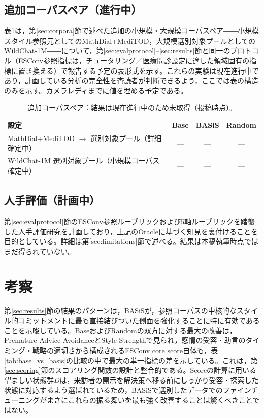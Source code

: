 \documentclass[manuscript,review,anonymous]{acmart}
\begin{document}
\subsection{追加コーパスペア（進行中）}
表\ref{tab:pending}は，第\ref{sec:corpora}節で述べた追加の小規模・大規模コーパスペア――小規模スタイル参照元としてのMathDial+MediTOD，大規模選別対象プールとしてのWildChat-1M――について，第\ref{sec:evalprotocol}--\ref{sec:results}節と同一のプロトコル（ESConv参照指標は，チュータリング／医療問診設定に適した領域固有の指標に置き換える）で報告する予定の表形式を示す。これらの実験は現在進行中であり，計画している分析の完全性を査読者が判断できるよう，ここでは表の構造のみを示す。カメラレディまでに値を埋める予定である。

\begin{table}[t]
  \caption{追加コーパスペア：結果は現在進行中のため未取得（投稿時点）。}
  \label{tab:pending}
  \begin{tabular}{lccc}
    \toprule
    設定 & Base & BASiS & Random \\
    \midrule
    MathDial+MediTOD $\to$ 選別対象プール（詳細確定中） & --- & --- & --- \\
    WildChat-1M 選別対象プール（小規模コーパス確定中） & --- & --- & --- \\
    \bottomrule
  \end{tabular}
\end{table}

\subsection{人手評価（計画中）}
第\ref{sec:evalprotocol}節のESConv参照ルーブリックおよび5軸ルーブリックを踏襲した人手評価研究を計画しており，上記のOracleに基づく知見を裏付けることを目的としている。詳細は第\ref{sec:limitations}節で述べる。結果は本稿執筆時点ではまだ得られていない。


\section{考察}
\label{sec:discussion}

第\ref{sec:results}節の結果のパターンは，BASiSが，参照コーパスの中核的なスタイル的コミットメントに最も直接結びついた側面を強化することに特に有効であることを示唆している。BaseおよびRandomの双方に対する最大の改善は，Premature Advice AvoidanceとStyle Strengthで見られ，感情の受容・助言のタイミング・戦略の適切さから構成されるESConv core score自体も，表\ref{tab:base_vs_basis}の比較の中で最大の単一指標の差を示している。これは，第\ref{sec:scoring}節のスコアリング関数の設計と整合的である。Scoreの計算に用いる望ましい状態群$D$は，来訪者の開示を解決策へ移る前にしっかり受容・探索した状態に対応するよう選ばれているため，BASiSで選別したデータでのファインチューニングがまさにこれらの振る舞いを最も強く改善することは驚くべきことではない。
\end{document}
